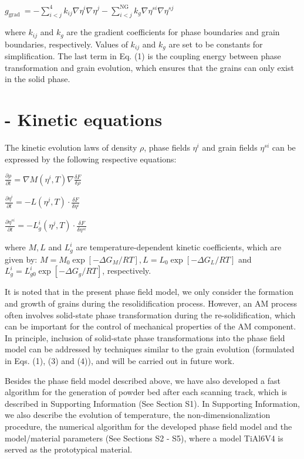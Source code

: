\documentclass[10pt]{article}
\begin{document}
$g_{\text {grad }}=-\sum_{i<j}^{4} k_{i j} \nabla \eta^{i} \nabla \eta^{j}-\sum_{i<j}^{\mathrm{NG}} k_{g} \nabla \eta^{s i} \nabla \eta^{s j}$

where $k_{i j}$ and $k_{g}$ are the gradient coefficients for phase boundaries and grain boundaries, respectively. Values of $k_{i j}$ and $k_{g}$ are set to be constants for simplification. The last term in Eq. (1) is the coupling energy between phase transformation and grain evolution, which ensures that the grains can only exist in the solid phase.

\section*{- Kinetic equations}
The kinetic evolution laws of density $\rho$, phase fields $\eta^{i}$ and grain fields $\eta^{s i}$ can be expressed by the following respective equations:

$\frac{\partial \rho}{\partial t}=\nabla M\left(\eta^{i}, T\right) \nabla \frac{\delta F}{\delta \rho}$

$\frac{\partial \eta^{i}}{\partial t}=-L\left(\eta^{j}, T\right) \cdot \frac{\delta F}{\delta \eta^{i}}$

$\frac{\partial \eta^{s i}}{\partial t}=-L_{g}^{i}\left(\eta^{j}, T\right) \cdot \frac{\delta F}{\delta \eta^{s i}}$

where $M, L$ and $L_{g}^{i}$ are temperature-dependent kinetic coefficients, which are given by: $M=M_{0} \exp \left[-\Delta G_{M} / R T\right], L=L_{0} \exp \left[-\Delta G_{L} / R T\right]$ and $L_{g}^{i}=L_{g 0}^{i} \exp \left[-\Delta G_{g} / R T\right]$, respectively.

It is noted that in the present phase field model, we only consider the formation and growth of grains during the resolidification process. However, an AM process often involves solid-state phase transformation during the re-solidification, which can be important for the control of mechanical properties of the AM component. In principle, inclusion of solid-state phase transformations into the phase field model can be addressed by techniques similar to the grain evolution (formulated in Eqs. (1), (3) and (4)), and will be carried out in future work.

Besides the phase field model described above, we have also developed a fast algorithm for the generation of powder bed after each scanning track, which is described in Supporting Information (See Section S1). In Supporting Information, we also describe the evolution of temperature, the non-dimensionalization procedure, the numerical algorithm for the developed phase field model and the model/material parameters (See Sections S2 - S5), where a model TiAl6V4 is served as the prototypical material.
\end{document}

